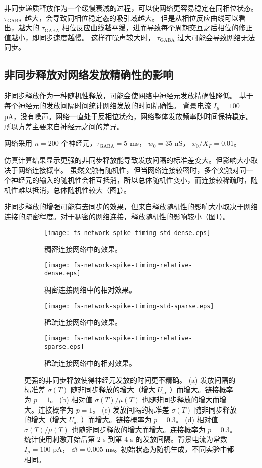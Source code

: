 非同步递质释放作为一个缓慢衰减的过程，可以使网络更容易稳定在同相位状态。
$\tau_\text{GABA}$ 越大，会导致同相位稳定态的吸引域越大。
但是从相位反应曲线可以看出，越大的 $\tau_\text{GABA}$ 相位反应曲线越平缓，进而导致每个周期交互之后相位的修正值越小，即同步速度越慢。
这样在噪声较大时， $\tau_\text{GABA}$ 过大可能会导致网络无法同步。

\subsection{非同步释放对网络发放精确性的影响}
\label{section:result:network-spike-timing}
非同步释放作为一种随机性释放，可能会使网络中神经元发放精确性降低。
基于每个神经元的发放间隔时间统计网络发放的时间精确性。
背景电流 $I_{\mu} = 100$ pA，没有噪声。网络一直处于反相位状态，网络整体发放频率随时间保持稳定。所以方差主要来自神经元之间的差异。

网络采用 $n = 200$ 个神经元，$\tau_\text{GABA} = 5$ ms， $w_0 = 35$ nS， $x_0 / X_F = 0.01$。

仿真计算结果显示更强的非同步释放能导致发放间隔的标准差变大。但影响大小取决于网络连接概率。
虽然突触有随机性，但当网络连接较密时，多个突触对同一个神经元的输入的随机性会相互抵消，所以总体随机性变小，而连接较稀疏时，随机性难以抵消，总体随机性较大（图\ref{figure:spike-timing-precision}）。

非同步释放的增强可能有去同步的效果，但来自释放随机性的影响大小取决于网络连接的疏密程度。对于稠密的网络连接，释放随机性的影响较小（图\ref{figure:spike-timing-precision}）。

\begin{figure}[H]
    \begin{subfigure}{0.5\textwidth}
        \texttt{[image: fs-network-spike-timing-std-dense.eps]}
        \caption{稠密连接网络中的效果。}
    \end{subfigure}
    \begin{subfigure}{0.5\textwidth}
        \texttt{[image: fs-network-spike-timing-relative-dense.eps]}
        \caption{稠密连接网络中的相对效果。}
    \end{subfigure}
    \begin{subfigure}{0.5\textwidth}
        \texttt{[image: fs-network-spike-timing-std-sparse.eps]}
        \caption{稀疏连接网络中的效果。}
    \end{subfigure}
    \begin{subfigure}{0.5\textwidth}
        \texttt{[image: fs-network-spike-timing-relative-sparse.eps]}
        \caption{稀疏连接网络中的相对效果。}
    \end{subfigure}
\caption{更强的非同步释放使得神经元发放的时间更不精确。
(a) 发放间隔的标准差 $\sigma(T)$ 随非同步释放的增大（增大 $U_\text{ar}$ ）而增大。链接概率为 $p = 1$。
(b) 相对值 $\sigma(T)/\mu(T)$ 也随非同步释放的增大而增大。连接概率为 $p = 1$。
(c) 发放间隔的标准差 $\sigma(T)$ 随非同步释放的增大（增大 $U_\text{ar}$ ）而增大。链接概率为 $p = 0.3$。
(d) 相对值 $\sigma(T)/\mu(T)$ 也随非同步释放的增大而增大。连接概率为 $p = 0.3$。
统计使用刺激开始后第 $2$ s 到第 $4$ s 的发放间隔。背景电流为常数 $I_{\mu} = 100$ pA， $\dd{t} = 0.005$ ms。初始状态为随机生成，不同实验中都相同。}
\label{figure:spike-timing-precision}
\end{figure}

